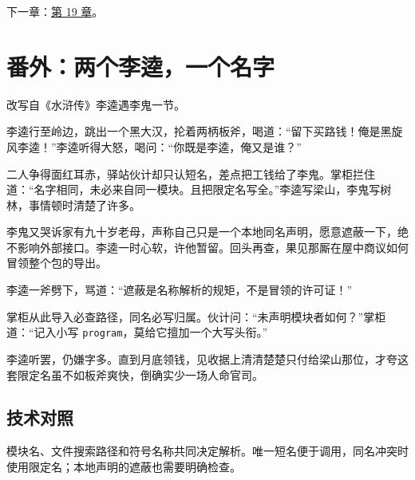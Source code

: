 下一章：\hyperref[ch:19]{第 19 章}。

\section{番外：两个李逵，一个名字}

改写自《水浒传》李逵遇李鬼一节。

李逵行至岭边，跳出一个黑大汉，抡着两柄板斧，喝道：“留下买路钱！俺是黑旋风李逵！”李逵听得大怒，喝问：“你既是李逵，俺又是谁？”

二人争得面红耳赤，驿站伙计却只认短名，差点把工钱给了李鬼。掌柜拦住道：“名字相同，未必来自同一模块。且把限定名写全。”李逵写梁山，李鬼写树林，事情顿时清楚了许多。

李鬼又哭诉家有九十岁老母，声称自己只是一个本地同名声明，愿意遮蔽一下，绝不影响外部接口。李逵一时心软，许他暂留。回头再查，果见那厮在屋中商议如何冒领整个包的导出。

李逵一斧劈下，骂道：“遮蔽是名称解析的规矩，不是冒领的许可证！”

掌柜从此导入必查路径，同名必写归属。伙计问：“未声明模块者如何？”掌柜道：“记入小写 \texttt{program}，莫给它擅加一个大写头衔。”

李逵听罢，仍嫌字多。直到月底领钱，见收据上清清楚楚只付给梁山那位，才夸这套限定名虽不如板斧爽快，倒确实少一场人命官司。

\subsection*{技术对照}

模块名、文件搜索路径和符号名称共同决定解析。唯一短名便于调用，同名冲突时使用限定名；本地声明的遮蔽也需要明确检查。

